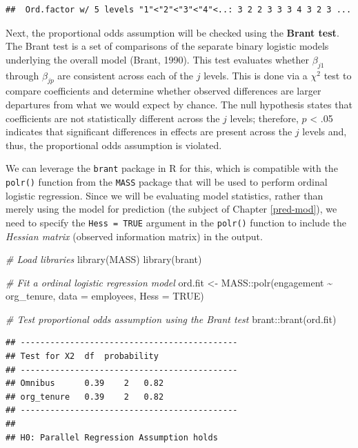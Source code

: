 \documentclass[
]{book}
\newenvironment{Shaded}{\begin{snugshade}}{\end{snugshade}}
\newcommand{\AttributeTok}[1]{\textcolor[rgb]{0.77,0.63,0.00}{#1}}
\newcommand{\CommentTok}[1]{\textcolor[rgb]{0.56,0.35,0.01}{\textit{#1}}}
\newcommand{\ConstantTok}[1]{\textcolor[rgb]{0.00,0.00,0.00}{#1}}
\newcommand{\FunctionTok}[1]{\textcolor[rgb]{0.00,0.00,0.00}{#1}}
\newcommand{\NormalTok}[1]{#1}
\newcommand{\OtherTok}[1]{\textcolor[rgb]{0.56,0.35,0.01}{#1}}
\newcommand{\SpecialCharTok}[1]{\textcolor[rgb]{0.00,0.00,0.00}{#1}}
\begin{document}
\begin{verbatim}
##  Ord.factor w/ 5 levels "1"<"2"<"3"<"4"<..: 3 2 2 3 3 3 4 3 2 3 ...
\end{verbatim}

Next, the proportional odds assumption will be checked using the \textbf{Brant test}. The Brant test is a set of comparisons of the separate binary logistic models underlying the overall model (Brant, 1990). This test evaluates whether \(\beta_{j1}\) through \(\beta_{jp}\) are consistent across each of the \(j\) levels. This is done via a \(\chi^2\) test to compare coefficients and determine whether observed differences are larger departures from what we would expect by chance. The null hypothesis states that coefficients are not statistically different across the \(j\) levels; therefore, \(p\) \textless{} .05 indicates that significant differences in effects are present across the \(j\) levels and, thus, the proportional odds assumption is violated.

We can leverage the \texttt{brant} package in R for this, which is compatible with the \texttt{polr()} function from the \texttt{MASS} package that will be used to perform ordinal logistic regression. Since we will be evaluating model statistics, rather than merely using the model for prediction (the subject of Chapter \ref{pred-mod}), we need to specify the \texttt{Hess\ =\ TRUE} argument in the \texttt{polr()} function to include the \emph{Hessian matrix} (observed information matrix) in the output.

\begin{Shaded}
\begin{Highlighting}[]
\CommentTok{\# Load libraries}
\FunctionTok{library}\NormalTok{(MASS)}
\FunctionTok{library}\NormalTok{(brant)}

\CommentTok{\# Fit a ordinal logistic regression model}
\NormalTok{ord.fit }\OtherTok{\textless{}{-}}\NormalTok{ MASS}\SpecialCharTok{::}\FunctionTok{polr}\NormalTok{(engagement }\SpecialCharTok{\textasciitilde{}}\NormalTok{ org\_tenure, }\AttributeTok{data =}\NormalTok{ employees, }\AttributeTok{Hess =} \ConstantTok{TRUE}\NormalTok{)}

\CommentTok{\# Test proportional odds assumption using the Brant test}
\NormalTok{brant}\SpecialCharTok{::}\FunctionTok{brant}\NormalTok{(ord.fit)}
\end{Highlighting}
\end{Shaded}

\begin{verbatim}
## -------------------------------------------- 
## Test for X2  df  probability 
## -------------------------------------------- 
## Omnibus      0.39    2   0.82
## org_tenure   0.39    2   0.82
## -------------------------------------------- 
## 
## H0: Parallel Regression Assumption holds
\end{verbatim}
\end{document}

